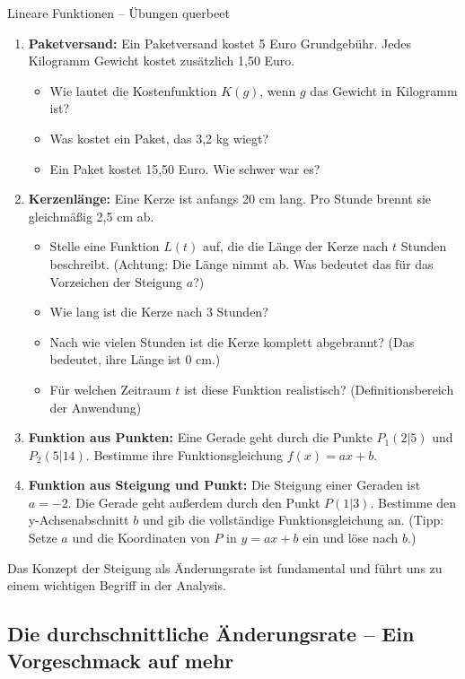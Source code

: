 \begin{aufgabenumgebung}{Lineare Funktionen – Übungen querbeet}
\begin{enumerate}
    \item \textbf{Paketversand:} Ein Paketversand kostet 5 Euro Grundgebühr. Jedes Kilogramm Gewicht kostet zusätzlich 1,50 Euro.
        \begin{itemize}
            \item Wie lautet die Kostenfunktion $K(g)$, wenn $g$ das Gewicht in Kilogramm ist?
            \item Was kostet ein Paket, das 3,2 kg wiegt?
            \item Ein Paket kostet 15,50 Euro. Wie schwer war es?
        \end{itemize}
    \item \textbf{Kerzenlänge:} Eine Kerze ist anfangs 20 cm lang. Pro Stunde brennt sie gleichmäßig 2,5 cm ab.
        \begin{itemize}
            \item Stelle eine Funktion $L(t)$ auf, die die Länge der Kerze nach $t$ Stunden beschreibt. (Achtung: Die Länge nimmt ab. Was bedeutet das für das Vorzeichen der Steigung $a$?)
            \item Wie lang ist die Kerze nach 3 Stunden?
            \item Nach wie vielen Stunden ist die Kerze komplett abgebrannt? (Das bedeutet, ihre Länge ist 0 cm.)
            \item Für welchen Zeitraum $t$ ist diese Funktion realistisch? (Definitionsbereich der Anwendung)
        \end{itemize}
    \item \textbf{Funktion aus Punkten:} Eine Gerade geht durch die Punkte $P_1(2|5)$ und $P_2(5|14)$. Bestimme ihre Funktionsgleichung $f(x)=ax+b$.
    \item \textbf{Funktion aus Steigung und Punkt:} Die Steigung einer Geraden ist $a = -2$. Die Gerade geht außerdem durch den Punkt $P(1|3)$. Bestimme den y-Achsenabschnitt $b$ und gib die vollständige Funktionsgleichung an. (Tipp: Setze $a$ und die Koordinaten von $P$ in $y=ax+b$ ein und löse nach $b$.)
\end{enumerate}
\end{aufgabenumgebung}

Das Konzept der Steigung als Änderungsrate ist fundamental und führt uns zu einem wichtigen Begriff in der Analysis.

\subsection{Die durchschnittliche Änderungsrate – Ein Vorgeschmack auf mehr}

